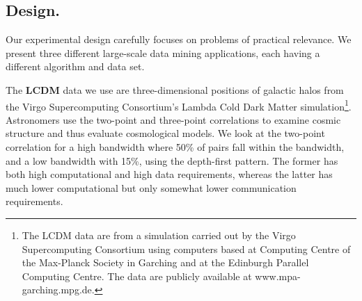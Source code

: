 \documentclass[twoside,leqno,twocolumn]{article}
\newcommand{\mysub}[1]{\subsection{#1.}}
\newcommand{\defterm}[1]{{\bf #1}}
\begin{document}
\mysub{Design}


Our experimental design carefully focuses on problems of practical relevance.
We present three different large-scale data mining applications, each having a different algorithm and data set.


%
%
%


The \defterm{LCDM} data we use are three-dimensional positions of galactic halos from the Virgo Supercomputing Consortium's Lambda Cold Dark Matter simulation\footnote{
    The LCDM data are from a simulation carried out by the Virgo Supercomputing Consortium using computers based at Computing Centre of the Max-Planck Society in Garching and at the Edinburgh Parallel Computing Centre.
    The data are publicly available at www.mpa-garching.mpg.de.}.
Astronomers use the two-point and three-point correlations to examine cosmic structure and thus evaluate cosmological models.
We look at the two-point correlation for a high bandwidth where 50\% of pairs fall within the bandwidth, and a low bandwidth with 15\%, using the depth-first pattern.
The former has both high computational and high data requirements, whereas the latter has much lower computational but only somewhat lower communication requirements.
\end{document}
